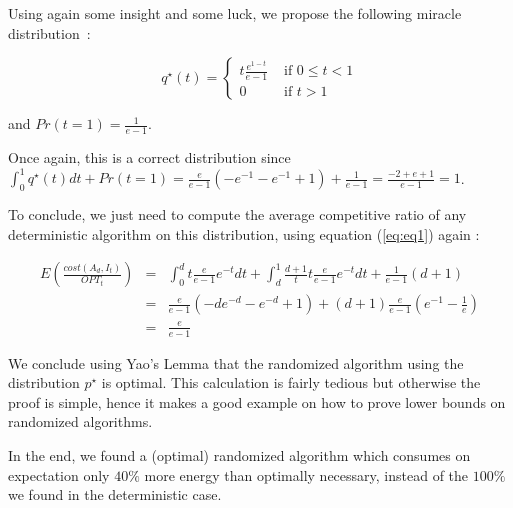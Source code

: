 \documentclass[a4paper,11pt]{article}
\begin{document}
Using again some insight and some luck, we propose the following miracle distribution~:

$$q^\star(t) = \left\{\begin{array}{ll} t \frac{e^{1-t}}{e-1} & \text{ if }  0\leq t <1 \\
0 & \text{ if } t >1\end{array}\right.$$

and $Pr(t=1) = \frac{1}{e-1}$.

Once again, this is a correct distribution since $\int_0^1 q^\star(t)dt + Pr(t=1)=\frac{e}{e-1}(-e^{-1} - e^{-1}+1)+\frac{1}{e-1}=\frac{-2+e+1}{e-1}=1$. 

To conclude, we just need to compute the average competitive ratio of any deterministic algorithm on this distribution, using equation (\ref{eq:eq1}) again :

\begin{eqnarray*}
E(\frac{cost(A_d,I_t)}{OPT_t}) &= &\int_0^d t \frac{e}{e-1}e^{-t}dt + \int_d^1 \frac{d+1}{t}t \frac{e}{e-1} e^{-t}dt + \frac{1}{e-1}(d+1)\\
&=& \frac{e}{e-1}(-de^{-d}-e^{-d}+1) + (d+1)\frac{e}{e-1}(e^{-1}-\frac{1}{e})\\
&=&\frac{e}{e-1}
\end{eqnarray*}

We conclude using Yao's Lemma that the randomized algorithm using the distribution $p^\star$ is optimal. This calculation is fairly tedious but otherwise the proof is simple, hence it makes a good example on how to prove lower bounds on randomized algorithms.

\bigskip

In the end, we found a (optimal) randomized algorithm which consumes on expectation only $40\%$ more energy than optimally necessary, instead of the $100\%$ we found in the deterministic case.
\end{document}
